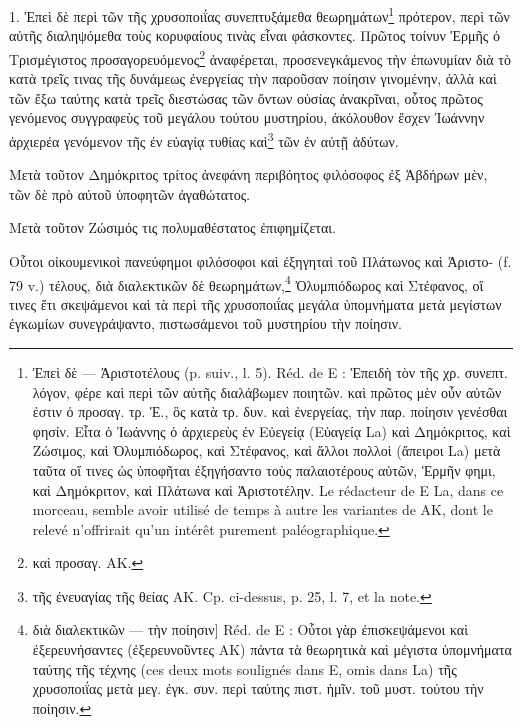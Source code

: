 \documentclass[a4paper, 11pt, oneside, polutonikogreek, french]{article}
\begin{document}
\bigskip

1. Ἐπεὶ δὲ περὶ τῶν τῆς χρυσοποιΐας συνεπτυξάμεθα θεωρημάτων\footnote{Ἐπεὶ δὲ --- Ἀριστοτέλους (p. suiv., l. 5). Réd. de E : Ἐπειδὴ τὸν τῆς χρ. συνεπτ. λόγον, φέρε καὶ περὶ τῶν αὐτῆς διαλάβωμεν ποιητῶν. καὶ πρῶτος μὲν οὖν αὐτῶν ἐστιν ὁ προσαγ. τρ. Ἑ., ὃς κατὰ τρ. δυν. καὶ ἐνεργείας, τὴν παρ. ποίησιν γενέσθαι φησίν. Εἶτα ὁ Ἰωάννης ὁ ἀρχιερεὺς ἐν Εὐεγείᾳ (Εὐαγείᾳ La) καὶ Δημόκριτος, καὶ Ζώσιμος, καὶ Ὀλυμπιόδωρος, καὶ Στέφανος, καὶ ἄλλοι πολλοὶ (ἄπειροι La) μετὰ ταῦτα οἵ τινες ὡς ὑποφῆται ἐξηγήσαντο τοὺς παλαιοτέρους αὐτῶν, Ἑρμῆν φημι, καὶ Δημόκριτον, καὶ Πλάτωνα καὶ Ἀριστοτέλην. Le rédacteur de E La, dans ce morceau, semble avoir utilisé de temps à autre les variantes de AK, dont le relevé n'offrirait qu'un intérêt purement paléographique.} πρότερον, περὶ τῶν αὐτῆς διαληψόμεθα τοὺς κορυφαίους τινὰς εἶναι φάσκοντες. Πρῶτος τοίνυν Ἑρμῆς ὁ Τρισμέγιστος προσαγορευόμενος\footnote{καὶ προσαγ. AK.} ἀναφέρεται, προσενεγκάμενος τὴν ἐπωνυμίαν διὰ τὸ κατὰ τρεῖς τινας τῆς δυνάμεως ἐνεργείας τὴν παροῦσαν ποίησιν γινομένην, ἀλλὰ καὶ τῶν ἔξω ταύτης κατὰ τρεῖς διεστώσας τῶν ὄντων οὐσίας ἀνακρῖναι, οὗτος πρῶτος γενόμενος συγγραφεὺς τοῦ μεγάλου τούτου μυστηρίου, ἀκόλουθον ἔσχεν Ἰωάννην ἀρχιερέα γενόμενον τῆς ἐν εὐαγίᾳ τυθίας καὶ\footnote{τῆς ἐνευαγίας τῆς θείας AK. Cp. ci-dessus, p. 25, l. 7, et la note.} τῶν ἐν αὐτῇ ἀδύτων.

Μετὰ τοῦτον Δημόκριτος τρίτος ἀνεφάνη περιβόητος φιλόσοφος ἐξ Ἀβδήρων μὲν, τῶν δὲ πρὸ αὐτοῦ ὑποφητῶν ἀγαθώτατος.

Μετὰ τοῦτον Ζώσιμός τις πολυμαθέστατος ἐπιφημίζεται.

Οὗτοι οἰκουμενικοὶ πανεύφημοι φιλόσοφοι καὶ ἐξηγηταὶ τοῦ Πλάτωνος καὶ Ἀριστο- (f. 79 v.) τέλους, διὰ διαλεκτικῶν δὲ θεωρημάτων,\footnote{διὰ διαλεκτικῶν --- τὴν ποίησιν] Réd. de E : Οὗτοι γὰρ ἐπισκεψάμενοι καὶ ἐξερευνήσαντες (ἐξερευνοῦντες AK) πάντα τὰ θεωρητικὰ καὶ μέγιστα ὑπομνήματα ταύτης τῆς τέχνης (ces deux mots soulignés dans E, omis dans La) τῆς χρυσοποιΐας μετὰ μεγ. ἐγκ. συν. περὶ ταύτης πιστ. ἡμῖν. τοῦ μυστ. τούτου τὴν ποίησιν.} Ὀλυμπιόδωρος καὶ Στέφανος, οἵ τινες ἔτι σκεψάμενοι καὶ τὰ περὶ τῆς χρυσοποιΐας μεγάλα ὑπομνήματα μετὰ μεγίστων ἐγκωμίων συνεγράψαντο, πιστωσάμενοι τοῦ μυστηρίου τὴν ποίησιν.
\end{document}

